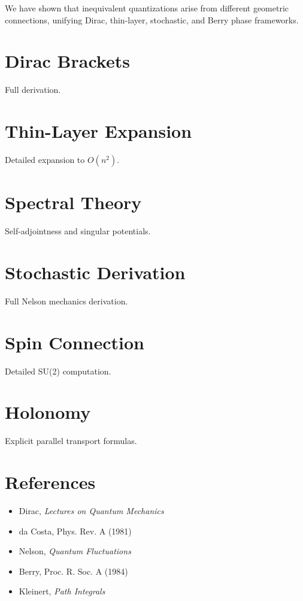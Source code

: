 \documentclass[11pt]{article}
\begin{document}
We have shown that inequivalent quantizations arise from different geometric connections, unifying Dirac, thin-layer, stochastic, and Berry phase frameworks.

\appendix

\section{Dirac Brackets}
Full derivation.

\section{Thin-Layer Expansion}
Detailed expansion to $O(n^2)$.

\section{Spectral Theory}
Self-adjointness and singular potentials.

\section{Stochastic Derivation}
Full Nelson mechanics derivation.

\section{Spin Connection}
Detailed SU(2) computation.

\section{Holonomy}
Explicit parallel transport formulas.

\section*{References}

\begin{itemize}
\item Dirac, \textit{Lectures on Quantum Mechanics}
\item da Costa, Phys. Rev. A (1981)
\item Nelson, \textit{Quantum Fluctuations}
\item Berry, Proc. R. Soc. A (1984)
\item Kleinert, \textit{Path Integrals}
\end{itemize}
\end{document}
